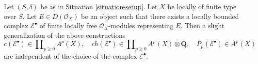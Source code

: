 %
\begin{lemma}
\label{lemma-pre-derived-chern-class}
Let $(S, \delta)$ be as in Situation \ref{situation-setup}.
Let $X$ be locally of finite type over $S$. Let $E \in D(\mathcal{O}_X)$
be an object such that there exists a locally bounded complex
$\mathcal{E}^\bullet$ of finite locally free $\mathcal{O}_X$-modules
representing $E$. Then a slight generalization of the above constructions
$$
c(\mathcal{E}^\bullet) \in \prod\nolimits_{p \geq 0} A^p(X),\quad
ch(\mathcal{E}^\bullet) \in
\prod\nolimits_{p \geq 0} A^p(X) \otimes \mathbf{Q},\quad
P_p(\mathcal{E}^\bullet) \in A^p(X)
$$
are independent of the choice of the complex $\mathcal{E}^\bullet$.
\end{lemma}

